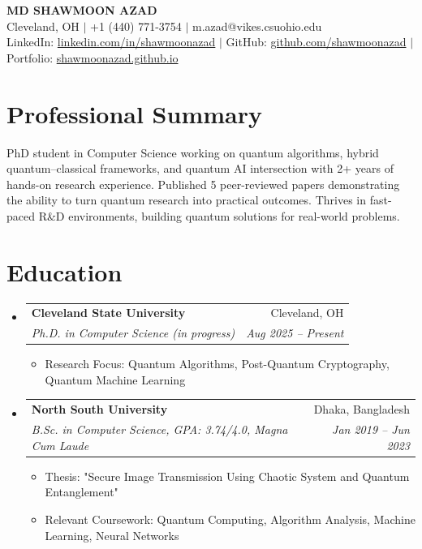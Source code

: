 \documentclass[10pt,letter]{article}
\makeatletter
\newcommand{\resumeItem}[1]{
  \item\small{
    {#1 \vspace{-2pt}}
  }
}
\newcommand{\resumeSubheading}[4]{
  \vspace{-2pt}\item
    \begin{tabular*}{\textwidth}[t]{l@{\extracolsep{\fill}}r}
      \textbf{#1} & #2 \\
      \textit{\small#3} & \textit{\small #4} \\
    \end{tabular*}\vspace{-7pt}
}
\newcommand{\resumeSubHeadingListStart}{\begin{itemize}[leftmargin=0.15in, label={}]}
\newcommand{\resumeSubHeadingListEnd}{\end{itemize}}
\newcommand{\resumeItemListStart}{\begin{itemize}}
\newcommand{\resumeItemListEnd}{\end{itemize}\vspace{-5pt}}
\makeatother
\begin{document}
\begin{center}
    \textbf{\Huge MD SHAWMOON AZAD}\\[4pt]
    Cleveland, OH $|$ +1 (440) 771-3754 $|$ m.azad@vikes.csuohio.edu\\[2pt]
    LinkedIn: \href{https://www.linkedin.com/in/shawmoonazad/}{linkedin.com/in/shawmoonazad} $|$ 
    GitHub: \href{https://github.com/shawmoonazad}{github.com/shawmoonazad} $|$
    Portfolio: \href{https://shawmoonazad.github.io}{shawmoonazad.github.io}
\end{center}

\section{Professional Summary}
PhD student in Computer Science working on quantum algorithms, hybrid quantum–classical frameworks, and quantum AI intersection with 2+ years of hands-on research experience. Published 5 peer-reviewed papers demonstrating the ability to turn quantum research into practical outcomes.  Thrives in fast-paced R\&D environments, building quantum solutions for real-world problems.

\section{Education}
  \resumeSubHeadingListStart
    \resumeSubheading
      {Cleveland State University}{Cleveland, OH}
      {Ph.D. in Computer Science (in progress)}{Aug 2025 -- Present}
      \resumeItemListStart
        \resumeItem{Research Focus: Quantum Algorithms, Post-Quantum Cryptography, Quantum Machine Learning}
      \resumeItemListEnd
      
      
    \resumeSubheading
      {North South University}{Dhaka, Bangladesh}
      {B.Sc. in Computer Science, GPA: 3.74/4.0, Magna Cum Laude}{Jan 2019 -- Jun 2023}
      \resumeItemListStart
        \resumeItem{Thesis: "Secure Image Transmission Using Chaotic System and Quantum Entanglement"}
        \resumeItem{Relevant Coursework: Quantum Computing, Algorithm Analysis, Machine Learning, Neural Networks}
      \resumeItemListEnd
  \resumeSubHeadingListEnd
\end{document}
